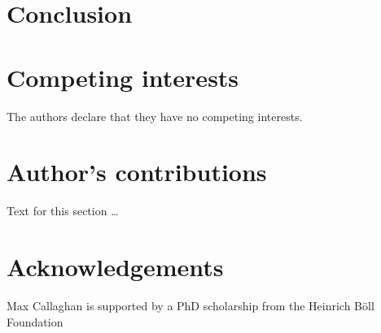 \documentclass{bmcart}
\begin{document}
	\section*{Conclusion}
	
\begin{backmatter}
	
	\section*{Competing interests}
	The authors declare that they have no competing interests.
	
	\section*{Author's contributions}
	Text for this section \ldots
	
	\section*{Acknowledgements}
	Max Callaghan is supported by a PhD scholarship from the Heinrich Böll Foundation
		
	
	
	
\end{backmatter}
\end{document}
